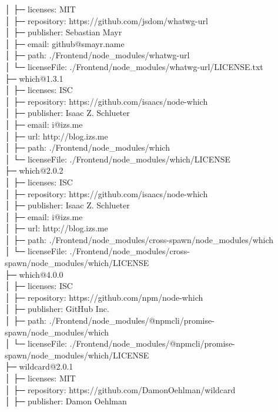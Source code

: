 │  ├─ licenses: MIT\\
│  ├─ repository: https://github.com/jsdom/whatwg-url\\
│  ├─ publisher: Sebastian Mayr\\
│  ├─ email: github@smayr.name\\
│  ├─ path: ./Frontend/node\_modules/whatwg-url\\
│  └─ licenseFile: ./Frontend/node\_modules/whatwg-url/LICENSE.txt\\
├─ which@1.3.1\\
│  ├─ licenses: ISC\\
│  ├─ repository: https://github.com/isaacs/node-which\\
│  ├─ publisher: Isaac Z. Schlueter\\
│  ├─ email: i@izs.me\\
│  ├─ url: http://blog.izs.me\\
│  ├─ path: ./Frontend/node\_modules/which\\
│  └─ licenseFile: ./Frontend/node\_modules/which/LICENSE\\
├─ which@2.0.2\\
│  ├─ licenses: ISC\\
│  ├─ repository: https://github.com/isaacs/node-which\\
│  ├─ publisher: Isaac Z. Schlueter\\
│  ├─ email: i@izs.me\\
│  ├─ url: http://blog.izs.me\\
│  ├─ path: ./Frontend/node\_modules/cross-spawn/node\_modules/which\\
│  └─ licenseFile: ./Frontend/node\_modules/cross-spawn/node\_modules/which/LICENSE\\
├─ which@4.0.0\\
│  ├─ licenses: ISC\\
│  ├─ repository: https://github.com/npm/node-which\\
│  ├─ publisher: GitHub Inc.\\
│  ├─ path: ./Frontend/node\_modules/@npmcli/promise-spawn/node\_modules/which\\
│  └─ licenseFile: ./Frontend/node\_modules/@npmcli/promise-spawn/node\_modules/which/LICENSE\\
├─ wildcard@2.0.1\\
│  ├─ licenses: MIT\\
│  ├─ repository: https://github.com/DamonOehlman/wildcard\\
│  ├─ publisher: Damon Oehlman\\
